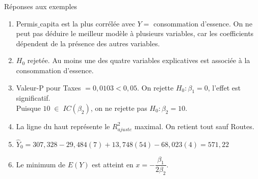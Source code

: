 \documentclass{BeamerTemplate}
\begin{document}
\begin{frame}[t]{Réponses aux exemples}

{\scriptsize

\begin{enumerate}\itemsep 1mm
  \item  Permis$\_$capita est la plus corrélée avec $Y=$ consommation d'essence. On ne peut pas déduire le meilleur modèle à plusieurs variables, car les coefficients dépendent de la présence des autres variables.
  \item $H_0$ rejetée. Au moins une des quatre variables explicatives est associée à la consommation d'essence.
  \item  Valeur-P pour Taxes $= 0,0103 < 0,05$. On rejette $H_0: \beta_1=0$, l'effet est significatif. \\
      Puisque  $10\;\in \; IC(\beta_2)$, on ne rejette pas  $H_0: \beta_2=10$.
  \item La ligne du haut représente le $R^2_{ajuste}$ maximal. On retient tout sauf Routes.
  \item $\hat Y_0=307,328-29,484(7)+13,748(54)-68,023(4) =571,22 $
  \item Le minimum de $E(Y)$ est atteint en  $x=-\dfrac{\beta_1}{2\beta_2}$.
  \end{enumerate}

 }
\end{frame}
\end{document}
